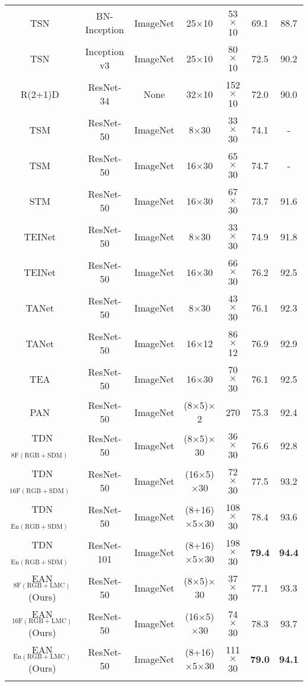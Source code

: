 \begin{table*}[!th]
{\begin{tabular}{ccccccc}
			\hline 	
			TSN~\cite{wang2016temporal}  & BN-Inception & ImageNet & 25$\times$10 & 53$\times$10 & 69.1 &88.7 \\ 
			TSN~\cite{wang2016temporal}  & Inception v3 & ImageNet & 25$\times$10 & 80$\times$10 & 72.5 &90.2 \\ 
			
			R(2+1)D~\cite{tran2018closer}  & ResNet-34 & None & 32$\times$10 & 152$\times$10 & 72.0 & 90.0 \\ 
			
			TSM~\cite{lin2019tsm}   & ResNet-50 & ImageNet & 8$\times$30 & 33$\times$30 & 74.1 &- \\ 
			TSM~\cite{lin2019tsm}   & ResNet-50 & ImageNet & 16$\times$30 & 65$\times$30 & 74.7 &-  \\ 
			
			STM~\cite{jiang2019stm}   & ResNet-50 & ImageNet & 16$\times$30 & 67$\times$30 & 73.7&91.6  \\ 
			
			TEINet~\cite{liu2020teinet}  & ResNet-50 & ImageNet & 8$\times$30 & 33$\times$30 & 74.9&91.8 \\ 
			TEINet~\cite{liu2020teinet}  & ResNet-50 & ImageNet & 16$\times$30 & 66$\times$30 & 76.2&92.5 \\
			
			TANet~\cite{liu2020teinet}  & ResNet-50 & ImageNet & 8$\times$30 & 43$\times$30 & 76.1&92.3 \\ 
			TANet~\cite{liu2020teinet}  & ResNet-50 & ImageNet & 16$\times$12 & 86$\times$12 & 76.9&92.9 \\
			TEA~\cite{li2020tea}  & ResNet-50 & ImageNet & 16$\times$30 & 70$\times$30 & 76.1&92.5 \\ 
			PAN~\cite{zhang2020pan}  & ResNet-50 & ImageNet &  (8$\times$5)$\times$2 & 270 & 75.3&92.4 \\
			TDN$_{\operatorname{8F(RGB+SDM)}}$~\cite{wang2020tdn}  & ResNet-50 & ImageNet & (8$\times$5)$\times$30 & 36$\times$30 & 76.6&92.8 \\
			TDN$_{\operatorname{16F(RGB+SDM)}}$~\cite{wang2020tdn}  & ResNet-50 & ImageNet & (16$\times$5)$\times$30 & 72$\times$30 & 77.5&93.2 \\
			TDN$_{\operatorname{En(RGB+SDM)}}$~\cite{wang2020tdn}  & ResNet-50 & ImageNet & (8+16)$\times$5$\times$30 & 108$\times$30 & 78.4&93.6 \\
			TDN$_{\operatorname{En(RGB+SDM)}}$~\cite{wang2020tdn}  & ResNet-101 & ImageNet & (8+16)$\times$5$\times$30 & 198$\times$30 & \textbf{79.4}&\textbf{94.4} \\
			\hline 
			EAN$_{\operatorname{8F(RGB+LMC)}}$(Ours) 	& ResNet-50 & ImageNet & (8$\times$5)$\times$30 &  37$\times$30 & 77.1 &93.3 \\
			EAN$_{\operatorname{16F(RGB+LMC)}}$(Ours)& ResNet-50 & ImageNet & (16$\times$5)$\times$30 &  74$\times$30 & 78.3 &93.7 \\
			EAN$_{\operatorname{En(RGB+LMC)}}$(Ours)& ResNet-50 & ImageNet & (8+16)$\times$5$\times$30 &  111$\times$30 & \textbf{79.0} &\textbf{94.1} \\
			\Xhline{2\arrayrulewidth}
		\end{tabular}
	}
	

\end{table*}
